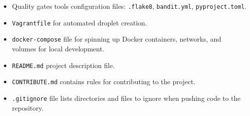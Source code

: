 \documentclass{article}
\begin{document}
\begin{itemize}
  \item Quality gates tools configuration files: \texttt{.flake8}, \texttt{bandit.yml}, \texttt{pyproject.toml}.
  
  \item \texttt{Vagrantfile} for automated droplet creation.
  
  \item \texttt{docker-compose} file for spinning up Docker containers, networks, and volumes for local development.
  
  \item \texttt{README.md} project description file.
  
  \item \texttt{CONTRIBUTE.md} contains rules for contributing to the project.
  
  \item \texttt{.gitignore} file lists directories and files to ignore when pushing code to the repository.
\end{itemize}
\end{document}
